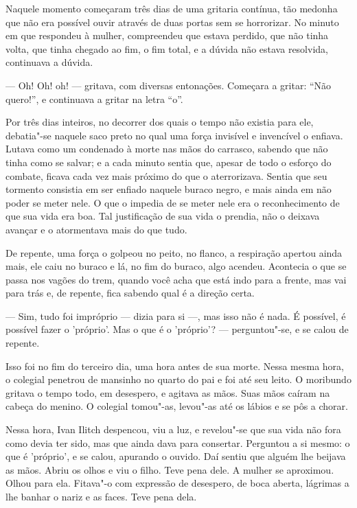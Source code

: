 Naquele momento começaram três dias de uma gritaria contínua, tão
medonha que não era possível ouvir através de duas portas sem se
horrorizar. No minuto em que respondeu à mulher, compreendeu que estava
perdido, que não tinha volta, que tinha chegado ao fim, o fim total, e a
dúvida não estava resolvida, continuava a dúvida.

--- Oh! Oh! oh! --- gritava, com diversas entonações. Começara a gritar:
``Não quero!'', e continuava a gritar na letra ``o''.

Por três dias inteiros, no decorrer dos quais o tempo não existia para
ele, debatia"-se naquele saco preto no qual uma força invisível e
invencível o enfiava. Lutava como um condenado à morte nas mãos do
carrasco, sabendo que não tinha como se salvar; e a cada minuto sentia
que, apesar de todo o esforço do combate, ficava cada vez mais próximo
do que o aterrorizava. Sentia que seu tormento consistia em ser enfiado
naquele buraco negro, e mais ainda em não poder se meter nele. O que o
impedia de se meter nele era o reconhecimento de que sua vida era boa.
Tal justificação de sua vida o prendia, não o deixava avançar e o
atormentava mais do que tudo.

De repente, uma força o golpeou no peito, no flanco, a respiração
apertou ainda mais, ele caiu no buraco e lá, no fim do buraco, algo
acendeu. Acontecia o que se passa nos vagões do trem, quando você acha
que está indo para a frente, mas vai para trás e, de repente, fica
sabendo qual é a direção certa.

--- Sim, tudo foi impróprio --- dizia para si ---, mas isso não é nada. É
possível, é possível fazer o 'próprio'. Mas o que é o 'próprio'? ---
perguntou"-se, e se calou de repente.

Isso foi no fim do terceiro dia, uma hora antes de sua morte. Nessa
mesma hora, o colegial penetrou de mansinho no quarto do pai e foi até
seu leito. O moribundo gritava o tempo todo, em desespero, e agitava as
mãos. Suas mãos caíram na cabeça do menino. O colegial tomou"-as,
levou"-as até os lábios e se pôs a chorar.

Nessa hora, Ivan Ilitch despencou, viu a luz, e revelou"-se que sua vida
não fora como devia ter sido, mas que ainda dava para consertar.
Perguntou a si mesmo: o que é 'próprio', e se calou, apurando o ouvido.
Daí sentiu que alguém lhe beijava as mãos. Abriu os olhos e viu o filho.
Teve pena dele. A mulher se aproximou. Olhou para ela. Fitava"-o com
expressão de desespero, de boca aberta, lágrimas a lhe banhar o nariz e
as faces. Teve pena dela.

